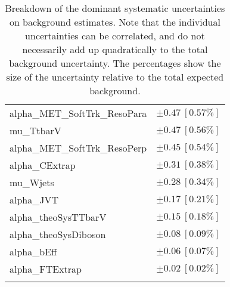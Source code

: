 \begin{table}
\begin{center}
\begin{tabular*}{\textwidth}{@{\extracolsep{\fill}}lc}
alpha\_MET\_SoftTrk\_ResoPara         & $\pm 0.47\ [0.57\%] $       \\
mu\_TtbarV         & $\pm 0.47\ [0.56\%] $       \\
alpha\_MET\_SoftTrk\_ResoPerp         & $\pm 0.45\ [0.54\%] $       \\
alpha\_CExtrap         & $\pm 0.31\ [0.38\%] $       \\
mu\_Wjets         & $\pm 0.28\ [0.34\%] $       \\
alpha\_JVT         & $\pm 0.17\ [0.21\%] $       \\
alpha\_theoSysTTbarV         & $\pm 0.15\ [0.18\%] $       \\
alpha\_theoSysDiboson         & $\pm 0.08\ [0.09\%] $       \\
alpha\_bEff         & $\pm 0.06\ [0.07\%] $       \\
alpha\_FTExtrap         & $\pm 0.02\ [0.02\%] $       \\
\noalign{\smallskip}\hline\noalign{\smallskip}
\end{tabular*}
\end{center}
\caption[Breakdown of uncertainty on background estimates]{
Breakdown of the dominant systematic uncertainties on background estimates.
Note that the individual uncertainties can be correlated, and do not necessarily add up quadratically to 
the total background uncertainty. The percentages show the size of the uncertainty relative to the total expected background.
\label{table.results.bkgestimate.uncertainties.VRTopE}}
\end{table}
%
